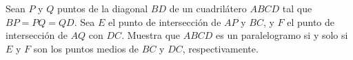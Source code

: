 Sean $P$ y $Q$ puntos de la diagonal $BD$ de un cuadrilátero $ABCD$ tal que $BP = PQ = QD$. Sea $E$ el punto de intersección de $AP$ y $BC$, y $F$ el punto de intersección de $AQ$ con $DC$. Muestra que $ABCD$ es un paralelogramo si y solo si $E$ y $F$ son los puntos medios de $BC$ y $DC$, respectivamente.